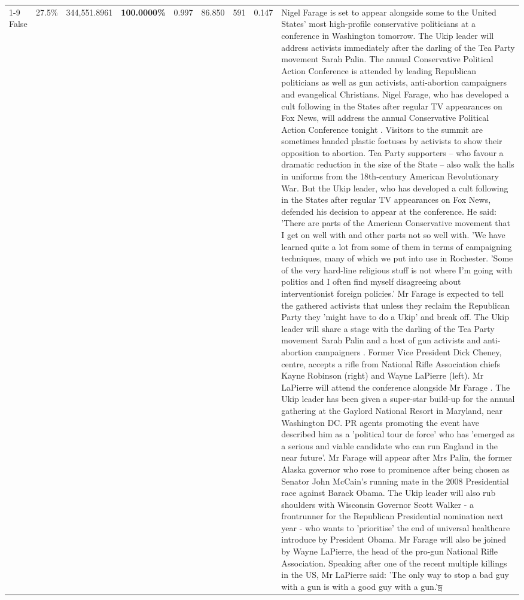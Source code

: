 \begin{table}[H]
\begin{tabular}{lllrlllll}
\cline{1-9} \cline{2-9}
False & 27.5\% & 344,551.8961 & \bfseries \color{red} 100.0000\% & 0.997 & 86.850 & 591 & 0.147 & Nigel Farage is set to appear alongside some to the United States' most high-profile conservative politicians at a conference in Washington tomorrow. The Ukip leader will address activists immediately after the darling of the Tea Party movement Sarah Palin. The annual Conservative Political Action Conference is attended by leading Republican politicians as well as gun activists, anti-abortion campaigners and evangelical Christians. Nigel Farage, who has developed a cult following in the States after regular TV appearances on Fox News, will address the annual Conservative Political Action Conference tonight . Visitors to the summit are sometimes handed plastic foetuses by activists to show their opposition to abortion. Tea Party supporters – who favour a dramatic reduction in the size of the State – also walk the halls in uniforms from the 18th-century American Revolutionary War. But the Ukip leader, who has developed a cult following in the States after regular TV appearances on Fox News, defended his decision to appear at the conference. He said: 'There are parts of the American Conservative movement that I get on well with and other parts not so well with. 'We have learned quite a lot from some of them in terms of campaigning techniques, many of which we put into use in Rochester. 'Some of the very hard-line religious stuff is not where I'm going with politics and I often find myself disagreeing about interventionist foreign policies.' Mr Farage is expected to tell the gathered activists that unless they reclaim the Republican Party they 'might have to do a Ukip' and break off. The Ukip leader will share a stage with the darling of the Tea Party movement Sarah Palin and a host of gun activists and anti-abortion campaigners . Former Vice President Dick Cheney, centre, accepts a rifle from National Rifle Association chiefs Kayne Robinson (right) and Wayne LaPierre (left). Mr LaPierre will attend the conference alongside Mr Farage . The Ukip leader has been given a super-star build-up for the annual gathering at the Gaylord National Resort in Maryland, near Washington DC. PR agents promoting the event have described him as a 'political tour de force' who has 'emerged as a serious and viable candidate who can run England in the near future'. Mr Farage will appear after Mrs Palin, the former Alaska governor who rose to prominence after being chosen as Senator John McCain's running mate in the 2008 Presidential race against Barack Obama. The Ukip leader will also rub shoulders with Wisconsin Governor Scott Walker - a frontrunner for the Republican Presidential nomination next year - who wants to 'prioritise' the end of universal healthcare introduce by President Obama. Mr Farage will also be joined by Wayne LaPierre, the head of the pro-gun National Rifle Association. Speaking after one of the recent multiple killings in the US, Mr LaPierre said: 'The only way to stop a bad guy with a gun is with a good guy with a gun.'ড্র \\

\end{tabular}
\end{table}
